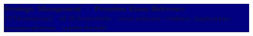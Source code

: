 \documentclass[7.6pt,letterpaper]{article}
\newif\ifprinterfriendly
\begin{document}
\fontsize{7.6pt}{8.8pt}\selectfont

\ifprinterfriendly
  \noindent\begin{center}
    {\fontsize{9pt}{10pt}\sffamily\bfseries Strategic Management — Premium Exam Reference}\\[2pt]
    {\fontsize{6pt}{7pt}\sffamily UCM-integrated $\cdot$ all 59 frameworks $\cdot$ exam patterns, evidence, implications, recommendations}
  \end{center}
  \vspace{2pt}
\else
  \noindent\colorbox{navy}{\parbox{\dimexpr\linewidth-2\fboxsep}{%
    \centering\vspace{1.5pt}
    {\fontsize{11pt}{13pt}\sffamily\bfseries\color{white}
     Strategic Management — Premium Exam Reference}\\[1pt]
    {\fontsize{6.2pt}{8pt}\sffamily\color{pale}
     UCM-integrated $\cdot$ all 59 frameworks $\cdot$ exam patterns, evidence, implications, recommendations $\cdot$ printer-friendly}
    \vspace{1.5pt}}}
  \vspace{3pt}
\fi
\end{document}
